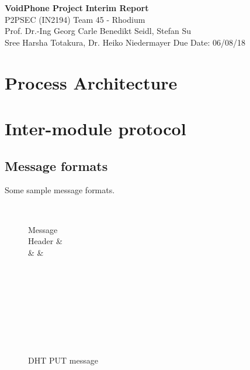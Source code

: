 \documentclass[a4paper, 11pt]{article}
\begin{document}
\noindent
\large\textbf{VoidPhone Project} \hfill \textbf{Interim Report}\\
\normalsize P2PSEC (IN2194)  \hfill Team 45 - Rhodium\\
Prof. Dr.-Ing Georg Carle \hfill Benedikt Seidl, Stefan Su\\
Sree Harsha Totakura, Dr. Heiko Niedermayer \hfill Due Date: 06/08/18

\section*{Process Architecture}




\section*{Inter-module protocol}


\subsection*{Message formats}

Some sample message formats.
\begin{figure}[h!]
	\centering
	\begin{bytefield}[bitwidth=0.8em]{32}
		 \\
		\begin{rightwordgroup}{Message \\  Header}
			 &  \\
			 &  & 
		\end{rightwordgroup} \\
		 \\
		\skippedwords \\
		 \\
		 \\
		\skippedwords \\
		 \\
	\end{bytefield}
	\caption{DHT PUT message}
	\label{DHTPUT}
\end{figure}
\end{document}
